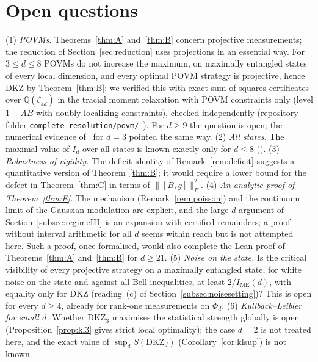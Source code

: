 \documentclass[11pt]{amsart}
\theoremstyle{definition}
\theoremstyle{remark}
\numberwithin{equation}{section}
\newcommand{\IME}{I_{\mathrm{ME}}}
\newcommand{\DKZ}{\mathrm{DKZ}}
\begin{document}
\section{Open questions}\label{sec:open}

(1) \emph{POVMs.} Theorems~\ref{thm:A} and~\ref{thm:B} concern projective measurements; the reduction of
Section~\ref{sec:reduction} uses projections in an essential way. For $3\le d\le8$ POVMs do not increase the maximum,
on maximally entangled states of every local dimension, and every optimal POVM strategy is projective, hence DKZ by
Theorem~\ref{thm:B}: we verified this with exact sum-of-squares certificates over $\mathbb Q(\zeta_{4d})$ in the tracial
moment relaxation with POVM constraints only (level $1{+}AB$ with doubly-localizing constraints), checked
independently (repository folder \texttt{complete-resolution/povm/}~\cite{repo-oqp27}). For $d\ge9$ the question is
open; the numerical evidence of~\cite{LVN} for $d=3$ pointed the same way. (2) \emph{All states.} The maximal value of $I_d$ over all states is
known exactly only for $d\le8$ (\cite{IR,repo-cglmp}). (3) \emph{Robustness of rigidity.} The deficit identity of
Remark~\ref{rem:deficit} suggests a quantitative version of Theorem~\ref{thm:B}; it would require a lower bound for the
defect in Theorem~\ref{thm:C} in terms of $\|[B,g]\|_F^2$. (4) \emph{An analytic proof of Theorem~\ref{thm:E}.} The
mechanism (Remark~\ref{rem:poisson}) and the continuum limit of the Gaussian modulation are explicit, and the large-$d$
argument of Section~\ref{subsec:regimeIII} is an expansion with certified remainders; a proof without interval
arithmetic for all $d$ seems within reach but is not attempted here. Such a proof, once formalised, would also complete
the Lean proof of Theorems~\ref{thm:A} and~\ref{thm:B} for $d\ge21$. (5) \emph{Noise on the state.} Is the critical
visibility of every projective strategy on a maximally entangled state, for white noise on the state and against all
Bell inequalities, at least $2/\IME(d)$, with equality only for DKZ (reading~(c) of Section~\ref{subsec:noisesetting})?
This is open for every $d\ge4$, already for rank-one measurements on $\Phi_d$. (6) \emph{Kullback--Leibler for small
$d$.} Whether $\DKZ_3$ maximises the statistical strength globally is open (Proposition~\ref{prop:kl3} gives strict
local optimality); the case $d=2$ is not treated here, and the exact value of $\sup_dS(\DKZ_d)$
(Corollary~\ref{cor:klsup}) is not known.
\end{document}
